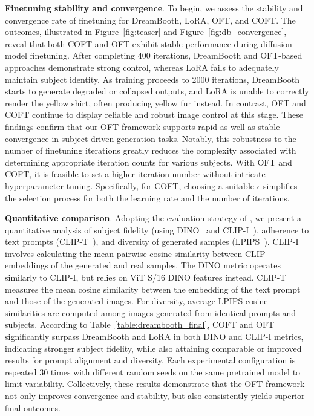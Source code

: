 \textbf{Finetuning stability and convergence}. To begin, we assess the stability and convergence rate of finetuning for DreamBooth, LoRA, OFT, and COFT. The outcomes, illustrated in Figure~\ref{fig:teaser} and Figure~\ref{fig:db_convergence}, reveal that both COFT and OFT exhibit stable performance during diffusion model finetuning. After completing 400 iterations, DreamBooth and OFT-based approaches demonstrate strong control, whereas LoRA fails to adequately maintain subject identity. As training proceeds to 2000 iterations, DreamBooth starts to generate degraded or collapsed outputs, and LoRA is unable to correctly render the yellow shirt, often producing yellow fur instead. In contrast, OFT and COFT continue to display reliable and robust image control at this stage. These findings confirm that our OFT framework supports rapid as well as stable convergence in subject-driven generation tasks. Notably, this robustness to the number of finetuning iterations greatly reduces the complexity associated with determining appropriate iteration counts for various subjects. With OFT and COFT, it is feasible to set a higher iteration number without intricate hyperparameter tuning. Specifically, for COFT, choosing a suitable $\epsilon$ simplifies the selection process for both the learning rate and the number of iterations.

\textbf{Quantitative comparison}. Adopting the evaluation strategy of \cite{ruiz2023dreambooth}, we present a quantitative analysis of subject fidelity (using DINO~\cite{caron2021emerging} and CLIP-I~\cite{radford2021learning}), adherence to text prompts (CLIP-T~\cite{radford2021learning}), and diversity of generated samples (LPIPS~\cite{zhang2018unreasonable}). CLIP-I involves calculating the mean pairwise cosine similarity between CLIP embeddings of the generated and real samples. The DINO metric operates similarly to CLIP-I, but relies on ViT S/16 DINO features instead. CLIP-T measures the mean cosine similarity between the embedding of the text prompt and those of the generated images. For diversity, average LPIPS cosine similarities are computed among images generated from identical prompts and subjects. According to Table~\ref{table:dreambooth_final}, COFT and OFT significantly surpass DreamBooth and LoRA in both DINO and CLIP-I metrics, indicating stronger subject fidelity, while also attaining comparable or improved results for prompt alignment and diversity. Each experimental configuration is repeated 30 times with different random seeds on the same pretrained model to limit variability. Collectively, these results demonstrate that the OFT framework not only improves convergence and stability, but also consistently yields superior final outcomes.

